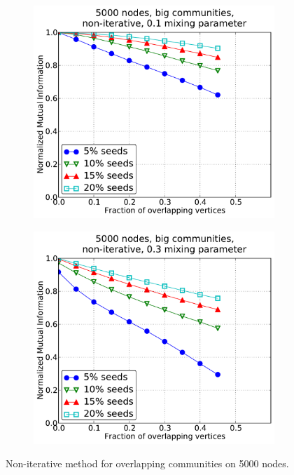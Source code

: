 \begin{figure}[h!]
\begin{subfigure}{0.5\textwidth}
    \end{subfigure}
    \begin{subfigure}{0.5\textwidth}
    \centering
    \includegraphics[width=\appplotwidth]{plots/overlap_noniter_1mu_d.pdf}
    \end{subfigure}%
    \begin{subfigure}{0.5\textwidth}
    \centering
    \includegraphics[width=\appplotwidth]{plots/overlap_noniter_3mu_d.pdf}
    \end{subfigure}
    \caption{Non-iterative method for overlapping communities on 5000 nodes.}\label{fig:no_iter_overlap_5000N}
\end{figure}
